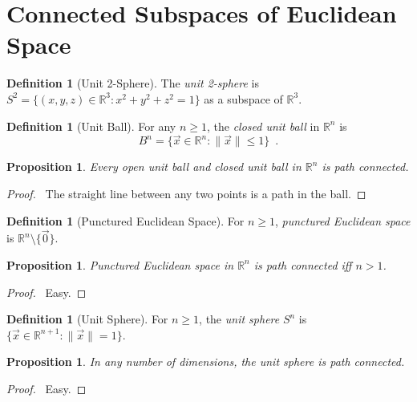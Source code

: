 \documentclass{report}
\let\qed\relax
\newtheorem{prop}[lm]{Proposition}
\theoremstyle{definition}
\newtheorem{df}[lm]{Definition}
\begin{document}
  \section{Connected Subspaces of Euclidean Space}

  \begin{df}[Unit 2-Sphere]
    The \emph{unit 2-sphere} is $S^2 = \{ (x, y, z) \in \mathbb{R}^3 : x^2 +
    y^2 + z^2 = 1 \}$ as a subspace of $\mathbb{R}^3$.
  \end{df}

  \begin{df}[Unit Ball]
    For any $n \geq 1$, the \emph{closed unit ball} in $\mathbb{R}^n$ is
    \[ B^n = \{ \vec{x} \in \mathbb{R}^n : \| \vec{x} \| \leq 1 \} \enspace . \]
  \end{df}

  \begin{prop}
    Every open unit ball and closed unit ball in $\mathbb{R}^n$ is path
    connected.
  \end{prop}

  \begin{proof}
    \pf\ The straight line between any two points is a path in the ball. \qed
  \end{proof}

  \begin{df}[Punctured Euclidean Space]
    For $n \geq 1$, \emph{punctured Euclidean space} is $\mathbb{R}^n \setminus
    \{ \vec{0} \}$.
  \end{df}

  \begin{prop}
    Punctured Euclidean space in $\mathbb{R}^n$ is path connected iff $n > 1$.
  \end{prop}

  \begin{proof}
    \pf\ Easy. \qed
  \end{proof}

  \begin{df}[Unit Sphere]
    For $n \geq 1$, the \emph{unit sphere} $S^n$ is $\{ \vec{x} \in
    \mathbb{R}^{n+1} : \| \vec{x} \| = 1 \}$.
  \end{df}

  \begin{prop}
    In any number of dimensions, the unit sphere is path connected.
  \end{prop}

  \begin{proof}
    \pf\ Easy. \qed
  \end{proof}
\end{document}
